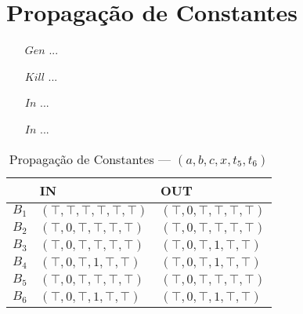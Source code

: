 \section{Propaga\c{c}\~ao de Constantes}

\begin{itemize}
  \item[$Gen$] ...
  \item[$Kill$] ...
  \item[$In$] ...
  \item[$In$] ...
\end{itemize}

\begin{table}[ht]
\centering
\begin{tabular}{l|l|l}
	& IN & OUT\\
\hline
$B_{1}$ &  $(\top,\top,\top,\top,\top,\top)$ & $(\top,0,\top,\top,\top,\top)$\\
$B_{2}$ &  $(\top,0,\top,\top,\top,\top)$ & $(\top,0,\top,\top,\top,\top)$\\
$B_{3}$ &  $(\top,0,\top,\top,\top,\top)$ & $(\top,0,\top,1,\top,\top)$\\
$B_{4}$ &  $(\top,0,\top,1,\top,\top)$ & $(\top,0,\top,1,\top,\top)$\\
$B_{5}$ &  $(\top,0,\top,\top,\top,\top)$ & $(\top,0,\top,\top,\top,\top)$\\
$B_{6}$ &  $(\top,0,\top,1,\top,\top)$ & $(\top,0,\top,1,\top,\top)$\\
\end{tabular}
\caption{Propaga\c{c}\~ao de Constantes --- $(a, b, c, x, t_{5}, t_{6})$}
\end{table}

